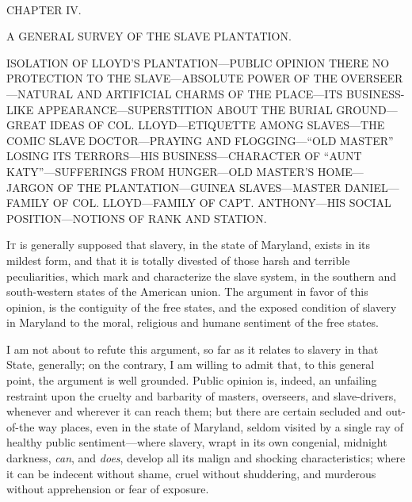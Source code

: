 {\protect\hypertarget{61}{}{}}

~

{CHAPTER IV.}

A GENERAL SURVEY OF THE SLAVE PLANTATION.

{ISOLATION OF LLOYD'S PLANTATION---PUBLIC OPINION THERE NO PROTECTION TO
THE SLAVE---ABSOLUTE POWER OF THE OVERSEER---NATURAL AND ARTIFICIAL
CHARMS OF THE PLACE---ITS BUSINESS-LIKE APPEARANCE---SUPERSTITION ABOUT
THE BURIAL GROUND---GREAT IDEAS OF COL. LLOYD---ETIQUETTE AMONG
SLAVES---THE COMIC SLAVE DOCTOR---PRAYING AND FLOGGING---``OLD MASTER''
LOSING ITS TERRORS---HIS BUSINESS---CHARACTER OF ``AUNT
KATY''---SUFFERINGS FROM HUNGER---OLD MASTER'S HOME---JARGON OF THE
PLANTATION---GUINEA SLAVES---MASTER DANIEL---FAMILY OF COL.
LLOYD---FAMILY OF CAPT. ANTHONY---HIS SOCIAL POSITION---NOTIONS OF RANK
AND STATION.}

\textsc{It} is generally supposed that slavery, in the state of
Maryland, exists in its mildest form, and that it is totally divested of
those harsh and terrible peculiarities, which mark and characterize the
slave system, in the southern and south-western states of the American
union. The argument in favor of this opinion, is the contiguity of the
free states, and the exposed condition of slavery in Maryland to the
moral, religious and humane sentiment of the free states.

I am not about to refute this argument, so far as it relates to slavery
in that State, generally; on the contrary, I am willing to admit that,
to this general point, the argument is well grounded. Public opinion is,
indeed, an unfailing restraint upon the cruelty and barbarity of
masters, overseers, and slave-drivers, whenever and wherever it can
reach them; but there {\protect\hypertarget{62}{}{}}are certain secluded
and out-of-the way places, even in the state of Maryland, seldom visited
by a single ray of healthy public sentiment---where slavery, wrapt in
its own congenial, midnight darkness, \emph{can}, and \emph{does},
develop all its malign and shocking characteristics; where it can be
indecent without shame, cruel without shuddering, and murderous without
apprehension or fear of exposure.

